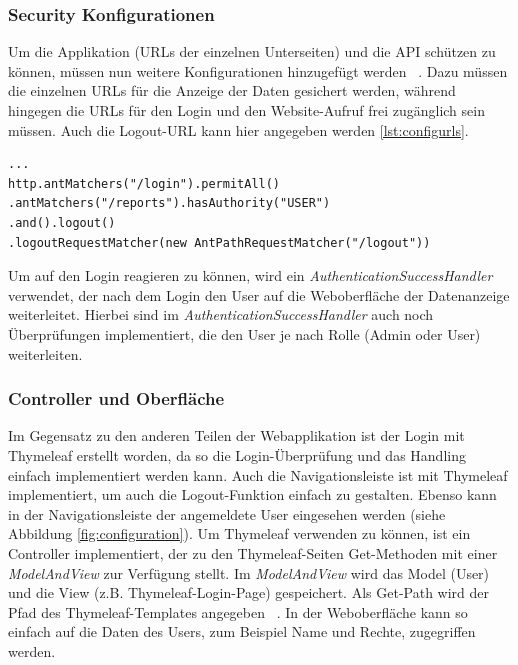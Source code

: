 \subsubsection{Security Konfigurationen}
Um die Applikation (URLs der einzelnen Unterseiten) und die API schützen zu können, müssen nun weitere Konfigurationen hinzugefügt werden ~\parencite{springSecBook}. Dazu müssen die einzelnen URLs für die Anzeige der Daten gesichert werden, während hingegen die URLs für den Login und den Website-Aufruf frei zugänglich sein müssen. Auch die Logout-URL kann hier angegeben werden \ref{lst:configurls}.
\lstset{
  caption=[Konfiguration für die Sicherheit der URLs.]{Konfiguration für die Sicherheit der URLs. Die einzelnen Paths können entweder für alle freigegeben oder für eine bestimmte Gruppe angezeigt werden. Das Abmelden wird von Spring automatisch durchgeführt.}, 
  basicstyle=\small\ttfamily, 
  label=lst:configurls, 
  language=Java,
  frame=single,
  breaklines=true, %
  postbreak=\mbox{\textcolor{red}{$\hookrightarrow$}\space},
}

\begin{samepage}%
	\begin{lstlisting}[float=tbhp]
...
http.antMatchers("/login").permitAll()
.antMatchers("/reports").hasAuthority("USER")
.and().logout()
.logoutRequestMatcher(new AntPathRequestMatcher("/logout"))
\end{lstlisting}
\end{samepage}
Um auf den Login reagieren zu können, wird ein \textit{AuthenticationSuccessHandler} verwendet, der nach dem Login den User auf die Weboberfläche der Datenanzeige weiterleitet. Hierbei sind im \textit{AuthenticationSuccessHandler} auch noch Überprüfungen implementiert, die den User je nach Rolle (Admin oder User) weiterleiten. 
\subsubsection{Controller und Oberfläche} 
Im Gegensatz zu den anderen Teilen der Webapplikation ist der Login mit Thymeleaf erstellt worden, da so die Login-Überprüfung und das Handling einfach implementiert werden kann. Auch die Navigationsleiste ist mit Thymeleaf implementiert, um auch die Logout-Funktion einfach zu gestalten. Ebenso kann in der Navigationsleiste der angemeldete User eingesehen werden (siehe Abbildung \ref{fig:configuration}). Um Thymeleaf verwenden zu können, ist ein Controller implementiert, der zu den Thymeleaf-Seiten Get-Methoden mit einer \textit{ModelAndView} zur Verfügung stellt. Im \textit{ModelAndView} wird das Model (User) und die View (z.B. Thymeleaf-Login-Page) gespeichert. Als Get-Path wird der Pfad des Thymeleaf-Templates angegeben ~\parencite[Seite 160]{springSecBook}. In der Weboberfläche kann so einfach auf die Daten des Users, zum Beispiel Name und Rechte, zugegriffen werden.
